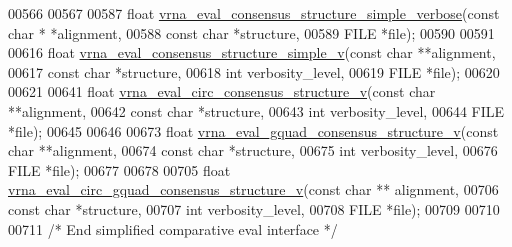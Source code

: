 \begin{DoxyCode}
00566 
00567 
00587 \textcolor{keywordtype}{float} \hyperlink{group__eval_ga1c07851f6b665c3461a19e9e4eb33d26}{vrna\_eval\_consensus\_structure\_simple\_verbose}(\textcolor{keyword}{const} \textcolor{keywordtype}{char} *
      *alignment,
00588                                                    \textcolor{keyword}{const} \textcolor{keywordtype}{char} *structure,
00589                                                    FILE       *file);
00590 
00591 
00616 \textcolor{keywordtype}{float} \hyperlink{group__eval_gad88927c62ab0a8b534e078e44be1b36e}{vrna\_eval\_consensus\_structure\_simple\_v}(\textcolor{keyword}{const} \textcolor{keywordtype}{char} **alignment,
00617                                              \textcolor{keyword}{const} \textcolor{keywordtype}{char} *structure,
00618                                              \textcolor{keywordtype}{int}        verbosity\_level,
00619                                              FILE       *file);
00620 
00621 
00641 \textcolor{keywordtype}{float} \hyperlink{group__eval_gae89240c230e4740b22a703ee953396b9}{vrna\_eval\_circ\_consensus\_structure\_v}(\textcolor{keyword}{const} \textcolor{keywordtype}{char} **alignment,
00642                                            \textcolor{keyword}{const} \textcolor{keywordtype}{char} *structure,
00643                                            \textcolor{keywordtype}{int}        verbosity\_level,
00644                                            FILE       *file);
00645 
00646 
00673 \textcolor{keywordtype}{float} \hyperlink{group__eval_ga8abc794fc48d43268ced5e8cde017baa}{vrna\_eval\_gquad\_consensus\_structure\_v}(\textcolor{keyword}{const} \textcolor{keywordtype}{char}  **alignment,
00674                                             \textcolor{keyword}{const} \textcolor{keywordtype}{char}  *structure,
00675                                             \textcolor{keywordtype}{int}         verbosity\_level,
00676                                             FILE        *file);
00677 
00678 
00705 \textcolor{keywordtype}{float} \hyperlink{group__eval_gaecd3e17292a0b3927277434019a5e187}{vrna\_eval\_circ\_gquad\_consensus\_structure\_v}(\textcolor{keyword}{const} \textcolor{keywordtype}{char} **
      alignment,
00706                                                  \textcolor{keyword}{const} \textcolor{keywordtype}{char} *structure,
00707                                                  \textcolor{keywordtype}{int}        verbosity\_level,
00708                                                  FILE       *file);
00709 
00710 
00711 \textcolor{comment}{/* End simplified comparative eval interface */}

\end{DoxyCode}
